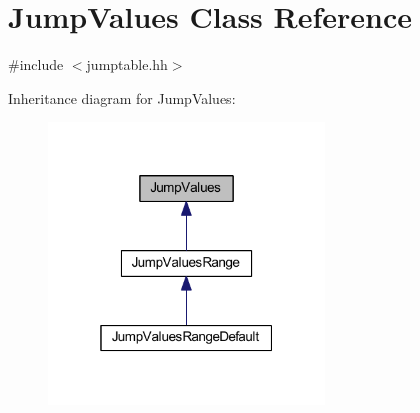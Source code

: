\hypertarget{class_jump_values}{}\section{Jump\+Values Class Reference}
\label{class_jump_values}


{\ttfamily \#include $<$jumptable.\+hh$>$}



Inheritance diagram for Jump\+Values\+:
\nopagebreak
\begin{figure}[H]
\begin{center}
\leavevmode
\includegraphics[width=208pt]{class_jump_values__inherit__graph}
\end{center}
\end{figure}
